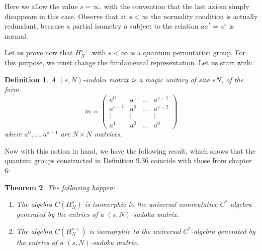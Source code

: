 \documentclass[12pt]{amsbook}
\newtheorem{theorem}{Theorem}[chapter]
\newtheorem{definition}[theorem]{Definition}
\begin{document}
Here we allow the value $s=\infty$, with the convention that the last axiom simply disappears in this case. Observe that at $s<\infty$ the normality condition is actually redundant, because a partial isometry $a$ subject to the relation $aa^*=a^s$ is normal.

\bigskip

Let us prove now that $H_N^{s+}$ with $s<\infty$ is a quantum permutation group. For this purpose, we must change the fundamental representation. Let us start with:


\begin{definition}
A $(s,N)$-sudoku matrix is a magic unitary of size $sN$, of the form
$$m=\begin{pmatrix}
a^0&a^1&\ldots&a^{s-1}\\
a^{s-1}&a^0&\ldots&a^{s-2}\\
\vdots&\vdots&&\vdots\\
a^1&a^2&\ldots&a^0
\end{pmatrix}$$
where $a^0,\ldots,a^{s-1}$ are $N\times N$ matrices.
\end{definition}

Now with this notion in hand, we have the following result, which shows that the quantum groups constructed in Definition 9.36 coincide with those from chapter 6:

\begin{theorem}
The following happen:
\begin{enumerate}
\item The algebra $C(H_N^s)$ is isomorphic to the universal commutative $C^*$-algebra generated by the entries of a $(s,N)$-sudoku matrix.

\item The algebra $C(H_N^{s+})$ is isomorphic to the universal $C^*$-algebra generated by the entries of a $(s,N)$-sudoku matrix.
\end{enumerate}
\end{theorem}
\end{document}
